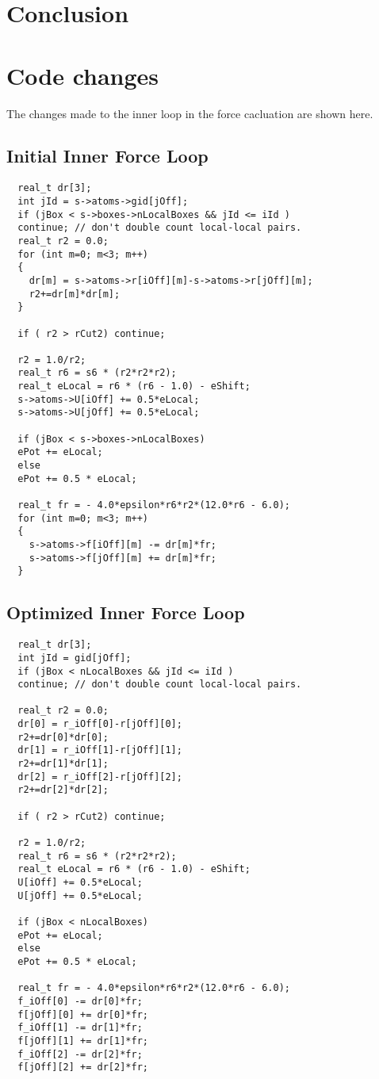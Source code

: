 \documentclass[12pt]{article}
\begin{document}
\section{Conclusion}



\appendix
\section{Code changes}
\label{apd:code-changes}
The changes made to the inner loop in the force cacluation are shown
here.
\subsection{Initial Inner Force Loop}
\begin{lstlisting}
  real_t dr[3];
  int jId = s->atoms->gid[jOff];  
  if (jBox < s->boxes->nLocalBoxes && jId <= iId )
  continue; // don't double count local-local pairs.
  real_t r2 = 0.0;
  for (int m=0; m<3; m++)
  {
    dr[m] = s->atoms->r[iOff][m]-s->atoms->r[jOff][m];
    r2+=dr[m]*dr[m];
  }

  if ( r2 > rCut2) continue;

  r2 = 1.0/r2;
  real_t r6 = s6 * (r2*r2*r2);
  real_t eLocal = r6 * (r6 - 1.0) - eShift;
  s->atoms->U[iOff] += 0.5*eLocal;
  s->atoms->U[jOff] += 0.5*eLocal;

  if (jBox < s->boxes->nLocalBoxes)
  ePot += eLocal;
  else
  ePot += 0.5 * eLocal;

  real_t fr = - 4.0*epsilon*r6*r2*(12.0*r6 - 6.0);
  for (int m=0; m<3; m++)
  {
    s->atoms->f[iOff][m] -= dr[m]*fr;
    s->atoms->f[jOff][m] += dr[m]*fr;
  }
\end{lstlisting}

\subsection{Optimized Inner Force Loop}
\begin{lstlisting}
  real_t dr[3];
  int jId = gid[jOff];  
  if (jBox < nLocalBoxes && jId <= iId )
  continue; // don't double count local-local pairs.

  real_t r2 = 0.0;
  dr[0] = r_iOff[0]-r[jOff][0];
  r2+=dr[0]*dr[0];
  dr[1] = r_iOff[1]-r[jOff][1];
  r2+=dr[1]*dr[1];
  dr[2] = r_iOff[2]-r[jOff][2];
  r2+=dr[2]*dr[2];

  if ( r2 > rCut2) continue;

  r2 = 1.0/r2;
  real_t r6 = s6 * (r2*r2*r2);
  real_t eLocal = r6 * (r6 - 1.0) - eShift;
  U[iOff] += 0.5*eLocal;
  U[jOff] += 0.5*eLocal;

  if (jBox < nLocalBoxes)
  ePot += eLocal;
  else
  ePot += 0.5 * eLocal;

  real_t fr = - 4.0*epsilon*r6*r2*(12.0*r6 - 6.0);
  f_iOff[0] -= dr[0]*fr;
  f[jOff][0] += dr[0]*fr;
  f_iOff[1] -= dr[1]*fr;
  f[jOff][1] += dr[1]*fr;
  f_iOff[2] -= dr[2]*fr;
  f[jOff][2] += dr[2]*fr;
\end{lstlisting}
\end{document}
